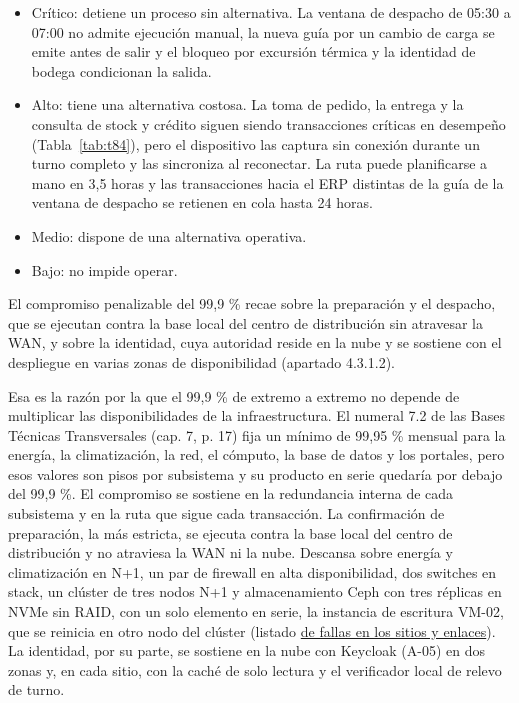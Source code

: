 \begin{itemize}
  \item Crítico: detiene un proceso sin alternativa. La ventana de despacho de 05:30 a 07:00 no admite ejecución manual, la nueva guía por un cambio de carga se emite antes de salir y el bloqueo por excursión térmica y la identidad de bodega condicionan la salida.
  \item Alto: tiene una alternativa costosa. La toma de pedido, la entrega y la consulta de stock y crédito siguen siendo transacciones críticas en desempeño (Tabla~\ref{tab:t84}), pero el dispositivo las captura sin conexión durante un turno completo y las sincroniza al reconectar. La ruta puede planificarse a mano en 3,5 horas y las transacciones hacia el ERP distintas de la guía de la ventana de despacho se retienen en cola hasta 24 horas.
  \item Medio: dispone de una alternativa operativa.
  \item Bajo: no impide operar.
\end{itemize}

El compromiso penalizable del 99,9 \% recae sobre la preparación y el despacho, que se ejecutan contra la base local del centro de distribución sin atravesar la WAN, y sobre la identidad, cuya autoridad reside en la nube y se sostiene con el despliegue en varias zonas de disponibilidad (apartado 4.3.1.2).

Esa es la razón por la que el 99,9 \% de extremo a extremo no depende de multiplicar las disponibilidades de la infraestructura. El numeral 7.2 de las Bases Técnicas Transversales (cap. 7, p. 17) fija un mínimo de 99,95 \% mensual para la energía, la climatización, la red, el cómputo, la base de datos y los portales, pero esos valores son pisos por subsistema y su producto en serie quedaría por debajo del 99,9 \%. El compromiso se sostiene en la redundancia interna de cada subsistema y en la ruta que sigue cada transacción. La confirmación de preparación, la más estricta, se ejecuta contra la base local del centro de distribución y no atraviesa la WAN ni la nube. Descansa sobre energía y climatización en N+1, un par de firewall en alta disponibilidad, dos switches en stack, un clúster de tres nodos N+1 y almacenamiento Ceph con tres réplicas en NVMe sin RAID, con un solo elemento en serie, la instancia de escritura VM-02, que se reinicia en otro nodo del clúster (listado \hyperref[tab:fallas-sitios]{de fallas en los sitios y enlaces}). La identidad, por su parte, se sostiene en la nube con Keycloak (A-05) en dos zonas y, en cada sitio, con la caché de solo lectura y el verificador local de relevo de turno.

